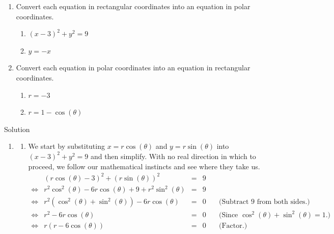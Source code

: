 \begin{example}
\label{eqnconversionex}
\begin{enumerate}

\item \label{recteqntopolar} Convert each equation in rectangular coordinates into an equation in polar coordinates.

\begin{enumerate}

\item  \label{ris6costheta} $(x-3)^2 + y^2 = 9$

\item  \label{yisnegx} $y = -x$

\end{enumerate}

\item \label{polareqntorect} Convert each equation in polar coordinates into an equation in rectangular coordinates.


\begin{enumerate}

\item  \label{risneg3} $r = -3$

\item \label{cardioidtorect} $r = 1 - \cos(\theta)$

\end{enumerate}
\end{enumerate}

Solution 

\begin{enumerate}

\item 

\begin{enumerate}

\item We start by substituting  $x = r\cos(\theta)$ and $y = r\sin(\theta)$ into $(x-3)^2 + y^2 = 9$ and then simplify.  With no real direction in which to proceed, we follow our mathematical instincts and see where they take us.
\[ \begin{array}{rrclr}

&(r\cos(\theta) - 3)^2+ (r\sin(\theta))^2 & = & 9& \\[3pt]
\Leftrightarrow&r^2\cos^2(\theta) - 6 r\cos(\theta) + 9 + r^2 \sin^{2}(\theta) & = &  9 \\[3pt]
\Leftrightarrow&r^2\left(\cos^2(\theta) + \sin^{2}(\theta)\right) - 6 r\cos(\theta) & = & 0 & \quad\text{(Subtract $9$ from both sides.)}\\[3pt]
\Leftrightarrow&r^2 - 6 r\cos(\theta) & = & 0 & \quad\text{(Since $\cos^2(\theta) + \sin^2(\theta) = 1$.)} \\[3pt]
\Leftrightarrow&r(r - 6 \cos(\theta)) & = & 0 &  \quad\text{(Factor.)} \\ \end{array} \]


\end{enumerate}
\end{enumerate}
\end{example}
